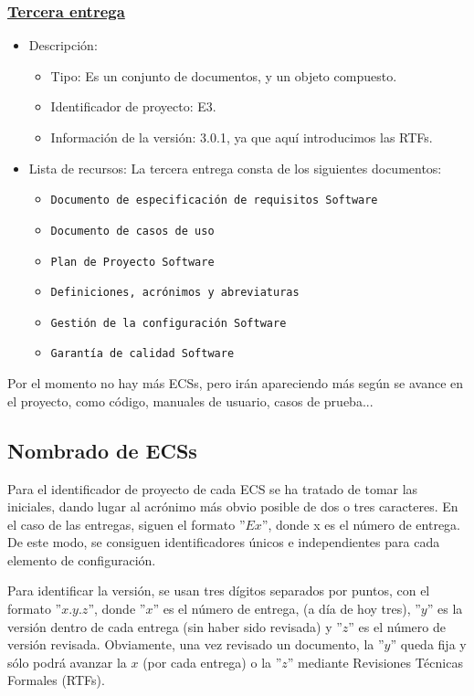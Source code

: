 \documentclass[spanish,a4paper,11pt, twoside]{report}	%
\begin{document}
			\subsubsection{\underline{Tercera entrega}}
			\begin{itemize}	
				\item{Descripción:}
					\begin{itemize}	
						\item{Tipo:} Es un conjunto de documentos, y un objeto compuesto.
						\item{Identificador de proyecto:} E3.
						\item{Información de la versión:} 3.0.1, ya que aquí introducimos las RTFs.
					\end{itemize}	
				\item{Lista de recursos:} La tercera entrega consta de los siguientes documentos:
					\begin{itemize}	
						\item \texttt{Documento de especificación de requisitos Software}
						\item \texttt{Documento de casos de uso}
						\item \texttt{Plan de Proyecto Software}
						\item \texttt{Definiciones, acrónimos y abreviaturas}
						\item \texttt{Gestión de la configuración Software}
						\item \texttt{Garantía de calidad Software}
					\end{itemize}
			\end{itemize}	

			Por el momento no hay más ECSs, pero irán apareciendo más según se avance en el proyecto, como código, manuales de usuario, casos de prueba...

		\subsection{Nombrado de ECSs}

		Para el identificador de proyecto de cada ECS se ha tratado de tomar las iniciales, dando lugar al acrónimo más obvio posible de dos o tres caracteres. En el caso de las entregas, siguen el formato ''$Ex$'', donde x es el número de entrega. De este modo, se consiguen identificadores únicos e independientes para cada elemento de configuración.

		Para identificar la versión, se usan tres dígitos separados por puntos, con el formato ''$x.y.z$'', donde ''$x$'' es el número de entrega, (a día de hoy tres), ''$y$'' es la versión dentro de cada entrega (sin haber sido revisada) y ''$z$'' es el número de versión revisada. Obviamente, una vez revisado un documento, la ''$y$'' queda fija y sólo podrá avanzar la $x$ (por cada entrega) o la ''$z$'' mediante Revisiones Técnicas Formales (RTFs).
		
\end{document}
